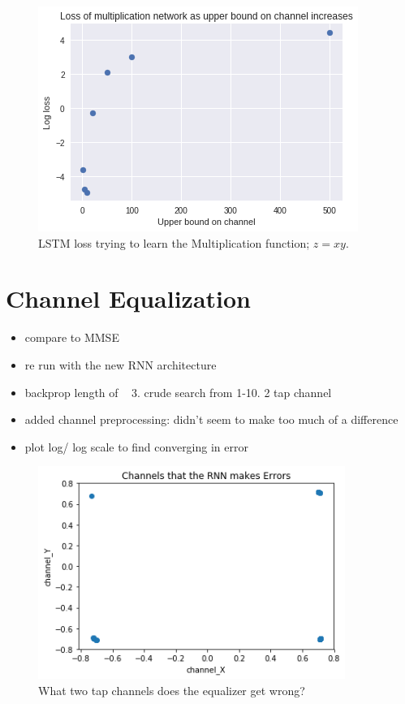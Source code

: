 \begin{figure}
\begin{center}
\includegraphics{figures/equal/Channel_upper_bound_multiplication.png}
\caption{LSTM loss trying to learn the Multiplication function; $z=xy$.}
\end{center}
\label{fig:mult_bound}
\end{figure}


\section{Channel Equalization}

\begin{itemize}
\item compare to MMSE
\item re run with the new RNN architecture
\item backprop length of ~ 3. crude search from 1-10. 2 tap channel
\item added channel preprocessing: didn't seem to make too much of a difference
\item plot log/ log scale to find converging in error
\end{itemize}

\begin{figure}
\begin{center}
\includegraphics[width=100mm]{figures/equal/incorrect_channels.png}
\caption{What two tap channels does the equalizer get wrong?}
\label{fig:incorr_chan}
\end{center}
\end{figure}

